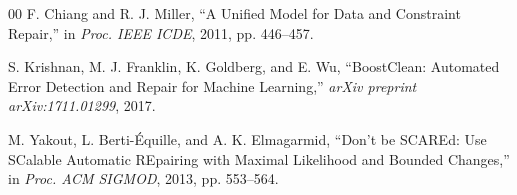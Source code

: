 \documentclass[sigconf]{acmart}
\begin{document}
\begin{thebibliography}{00}
F. Chiang and R. J. Miller,
``A Unified Model for Data and Constraint Repair,''
in \textit{Proc. IEEE ICDE}, 2011, pp. 446--457.

S. Krishnan, M. J. Franklin, K. Goldberg, and E. Wu,
``BoostClean: Automated Error Detection and Repair for Machine Learning,''
\textit{arXiv preprint arXiv:1711.01299}, 2017.

M. Yakout, L. Berti-\'{E}quille, and A. K. Elmagarmid,
``Don't be SCAREd: Use SCalable Automatic REpairing with Maximal Likelihood and Bounded Changes,''
in \textit{Proc. ACM SIGMOD}, 2013, pp. 553--564.

\end{thebibliography}
\end{document}
